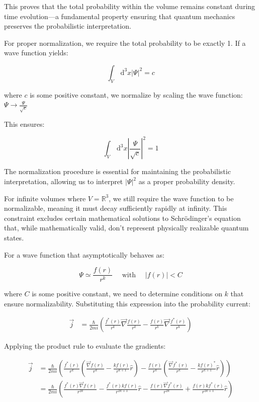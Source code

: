 This proves that the total probability within the volume remains constant during time evolution—a fundamental property ensuring that quantum mechanics preserves the probabilistic interpretation.

For proper normalization, we require the total probability to be exactly 1. If a wave function yields:

\begin{equation}
\int_{V} \, \mathrm{d}^{3} x|\Psi|^{2}=c
\end{equation}

where $c$ is some positive constant, we normalize by scaling the wave function:
$\Psi \rightarrow \frac{\Psi}{\sqrt{c}}$

This ensures:

\begin{equation}
\int_{V} \, \mathrm{d}^{3} x\left|\frac{\Psi}{\sqrt{c}}\right|^{2}=1
\end{equation}

The normalization procedure is essential for maintaining the probabilistic interpretation, allowing us to interpret $|\Psi|^2$ as a proper probability density.

For infinite volumes where $V=\mathbb{R}^{3}$, we still require the wave function to be normalizable, meaning it must decay sufficiently rapidly at infinity. This constraint excludes certain mathematical solutions to Schrödinger's equation that, while mathematically valid, don't represent physically realizable quantum states.


For a wave function that asymptotically behaves as:

\begin{equation}
\Psi \simeq \frac{f(r)}{r^{k}} \quad \text { with } \quad|f(r)|<C
\end{equation}

where $C$ is some positive constant, we need to determine conditions on $k$ that ensure normalizability. Substituting this expression into the probability current:

\begin{align}
\vec{j} &= \frac{\hbar}{2 m i}\left(\frac{f^{*}(r)}{r^{k}} \vec{\nabla} \frac{f(r)}{r^{k}}-\frac{f(r)}{r^{k}} \vec{\nabla} \frac{f^{*}(r)}{r^{k}}\right)
\end{align}

Applying the product rule to evaluate the gradients:

\begin{align}
\vec{j} &= \frac{\hbar}{2 m i}\left(\frac{f^{*}(r)}{r^{k}}\left(\frac{\vec{\nabla} f(r)}{r^{k}}-\frac{k f(r)}{r^{k+1}}\hat{r}\right)-\frac{f(r)}{r^{k}}\left(\frac{\vec{\nabla} f^{*}(r)}{r^{k}}-\frac{k f(r)^{*}}{r^{k+1}}\hat{r}\right)\right) \\
&= \frac{\hbar}{2 m i}\left(\frac{f^{*}(r) \vec{\nabla} f(r)}{r^{2 k}}-\frac{f^{*}(r) k f(r)}{r^{2 k+1}}\hat{r}-\frac{f(r) \vec{\nabla} f^{*}(r)}{r^{2 k}}+\frac{f(r) k f^{*}(r)}{r^{2 k+1}}\hat{r}\right)
\end{align}

